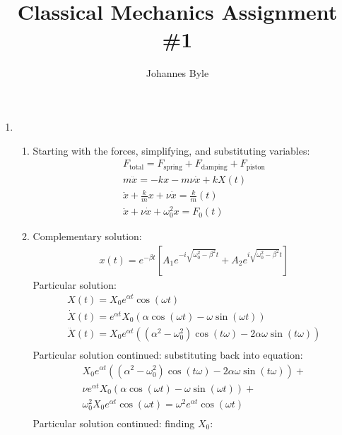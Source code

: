 \documentclass[12pt]{article}
\title{Classical Mechanics Assignment \#1}
\author{Johannes Byle}
\begin{document}
    \maketitle
    \begin{enumerate}
        \item
        \begin{enumerate}
            \item
            Starting with the forces, simplifying, and substituting variables:
            \begin{gather*}
                F_{\text{total}}=F_{\text{spring}}+F_{\text{damping}}+F_{\text{piston}}\\
                m\ddot{x}=-kx-m\nu\dot{x}+kX(t)\\
                \ddot{x}+\frac{k}{m}x+\nu\dot{x}=\frac{k}{m}(t)\\
                \ddot{x}+\nu\dot{x}+\omega_0^2 x=F_0(t)
            \end{gather*}
            \item
            Complementary solution:
            \begin{gather*}
                x(t)=e^{-\beta t}\left[A_1 e^{-i\sqrt{\omega_0^2-\beta^2}t}+A_2 e^{i\sqrt{\omega_0^2-\beta^2}t}\right]
            \end{gather*}
            Particular solution:
            \begin{gather*}
                X(t)=X_0 e^{\alpha t}\cos(\omega t)\\
                \dot{X}(t)=e^{\alpha t}X_0\left(\alpha\cos(\omega t)-\omega\sin(\omega t)\right)\\
                \ddot{X}(t)=X_0 e^{\alpha t} \left(\left(\alpha^2-\omega_0^2\right) \cos (t \omega)-2 \alpha \omega \sin (t \omega)\right)\\
            \end{gather*}
            Particular solution continued: substituting back into equation:
            \begin{gather*}
                X_0 e^{\alpha t} \left(\left(\alpha^2-\omega_0^2\right) \cos (t \omega)-2 \alpha \omega \sin (t \omega)\right)+\\
                \nu e^{\alpha t}X_0\left(\alpha\cos(\omega t)-\omega\sin(\omega t)\right)+\\
                \omega_0^2 X_0 e^{\alpha t}\cos(\omega t)=\omega^2 e^{\alpha t}\cos(\omega t)\\
            \end{gather*}
            Particular solution continued: finding $X_0$:

\end{enumerate}
\end{enumerate}
\end{document}
